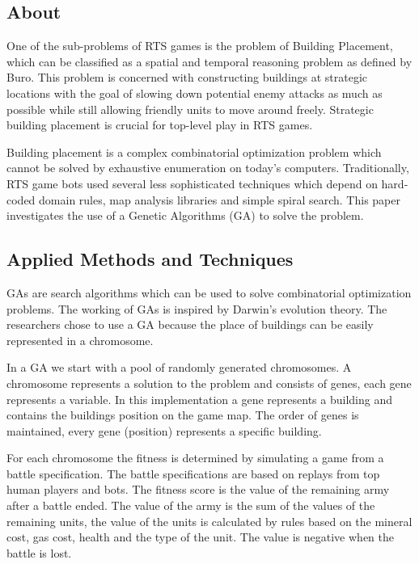 \label{chapter:genetic-building}

\subsection{About}

One of the sub-problems of RTS games is the problem of Building Placement, which can be classified as a spatial and temporal reasoning problem as defined by Buro. This problem is concerned with constructing buildings at strategic locations with the goal of slowing down potential enemy attacks as much as possible while still allowing friendly units to move around freely. Strategic building placement is crucial for top-level play in RTS games\citep{barriga2014building}.

Building placement is a complex combinatorial optimization problem which cannot be solved by exhaustive enumeration on today’s computers\citep{barriga2014building}. Traditionally, RTS game bots used several less sophisticated techniques which depend on hard-coded domain rules, map analysis libraries and simple spiral search. This paper investigates the use of a Genetic Algorithms (GA) to solve the problem.

\subsection{Applied Methods and Techniques}

GAs are search algorithms which can be used to solve combinatorial optimization problems. The working of GAs is inspired by Darwin's evolution theory\citep{darwin1859origin}. The researchers chose to use a GA because the place of buildings can be easily represented in a chromosome.

In a GA we start with a pool of randomly generated chromosomes. A chromosome represents a solution to the problem and consists of genes, each gene represents a variable. In this implementation a gene represents a building and contains the buildings position on the game map. The order of genes is maintained, every gene (position) represents a specific building.

For each chromosome the fitness is determined by simulating a game from a battle specification. The battle specifications are based on replays from top human players and bots. The fitness score is the value of the remaining army after a battle ended. The value of the army is the sum of the values of the remaining units, the value of the units is calculated by rules based on the mineral cost, gas cost, health and the type of the unit. The value is negative when the battle is lost.

